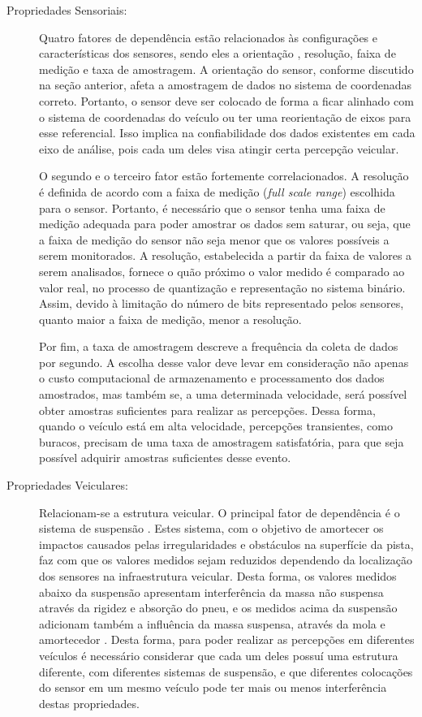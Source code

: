\begin{description}
	
	\item [Propriedades Sensoriais:] 
	
	Quatro fatores de dependência estão relacionados às configurações e características dos sensores, sendo eles a orientação \cite{Kumar2017,Alam2020}, resolução, faixa de medição e taxa de amostragem. A orientação do sensor, conforme discutido na seção anterior, afeta a amostragem de dados no sistema de coordenadas correto. Portanto, o sensor deve ser colocado de forma a ficar alinhado com o sistema de coordenadas do veículo ou ter uma reorientação de eixos para esse referencial. Isso implica na confiabilidade dos dados existentes em cada eixo de análise, pois cada um deles visa atingir certa percepção veicular.

	O segundo e o terceiro fator estão fortemente correlacionados. A resolução é definida de acordo com a faixa de medição (\textit{full scale range}) escolhida para o sensor. Portanto, é necessário que o sensor tenha uma faixa de medição adequada para poder amostrar os dados sem saturar, ou seja, que a faixa de medição do sensor não seja menor que os valores possíveis a serem monitorados. A resolução, estabelecida a partir da faixa de valores a serem analisados, fornece o quão próximo o valor medido é comparado ao valor real, no processo de quantização e representação no sistema binário. Assim, devido à limitação do número de bits representado pelos sensores, quanto maior a faixa de medição, menor a resolução.
	
	Por fim, a taxa de amostragem descreve a frequência da coleta de dados por segundo. A escolha desse valor deve levar em consideração não apenas o custo computacional de armazenamento e processamento dos dados amostrados, mas também se, a uma determinada velocidade, será possível obter amostras suficientes para realizar as percepções. Dessa forma, quando o veículo está em alta velocidade, percepções transientes, como buracos, precisam de uma taxa de amostragem satisfatória, para que seja possível adquirir amostras suficientes desse evento.
	
	\item [Propriedades Veiculares:] 
	
	Relacionam-se a estrutura veicular. O principal fator de dependência é o sistema de suspensão \cite{Kumar2017, Wickramarathne2018,Alam2020}. Estes sistema, com o objetivo de amortecer os impactos causados pelas irregularidades e obstáculos na superfície da pista, faz com que os valores medidos sejam reduzidos dependendo da localização dos sensores na infraestrutura veicular. Desta forma, os valores medidos abaixo da suspensão apresentam interferência da massa não suspensa através da rigidez e absorção do pneu, e os medidos acima da suspensão adicionam também a influência da massa suspensa, através da mola e amortecedor \cite{Yafeai2019}. Desta forma, para poder realizar as percepções em diferentes veículos é necessário considerar que cada um deles possuí uma estrutura diferente, com diferentes sistemas de suspensão, e que diferentes colocações do sensor em um mesmo veículo pode ter mais ou menos interferência destas propriedades.


\end{description}

